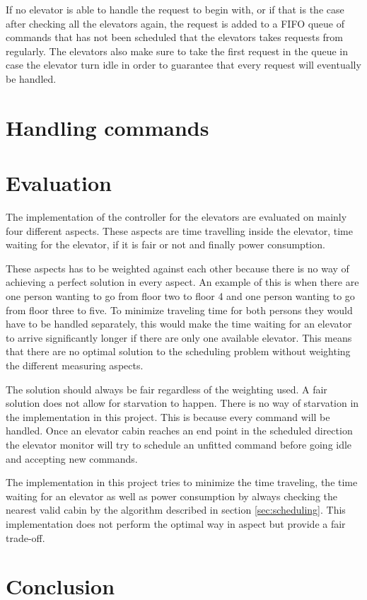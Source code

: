 \documentclass[10pt,a4paper]{article}
\begin{document}
If no elevator is able to handle the request to begin with, or if that is the case after checking all the elevators again, the request is added to a FIFO queue of commands that has not been scheduled that the elevators takes requests from regularly. The elevators also make sure to take the first request in the queue in case the elevator turn idle in order to guarantee that every request will eventually be handled.

\section{Handling commands}
\label{sec:commands}

\section{Evaluation}
\label{sec:eval}
The implementation of the controller for the elevators are evaluated on mainly four different aspects. These aspects are time travelling inside the elevator, time waiting for the elevator, if it is fair or not and finally power consumption.

These aspects has to be weighted against each other because there is no way of achieving a perfect solution in every aspect. An example of this is when there are one person wanting to go from floor two to floor 4 and one person wanting to go from floor three to five. To minimize traveling time for both persons they would have to be handled separately, this would make the time waiting for an elevator to arrive significantly longer if there are only one available elevator. This means that there are no optimal solution to the scheduling problem without weighting the different measuring aspects.

The solution should always be fair regardless of the weighting used. A fair solution does not allow for starvation to happen. There is no way of starvation in the implementation in this project. This is because every command will be handled. Once an elevator cabin reaches an end point in the scheduled direction the elevator monitor will try to schedule an unfitted command before going idle and accepting new commands.

The implementation in this project tries to minimize the time traveling, the time waiting for an elevator as well as power consumption by always checking the nearest valid cabin by the algorithm described in section \ref{sec:scheduling}. This implementation does not perform the optimal way in aspect but provide a fair trade-off.

\section{Conclusion}
\label{sec:conclusion}
\end{document}
